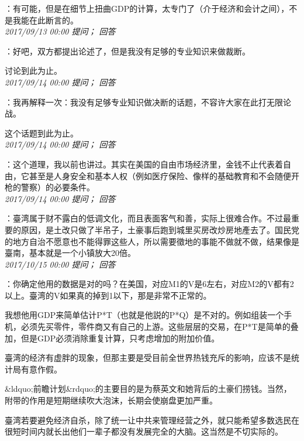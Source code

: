 \documentclass[twocolumn]{ctexart}
\begin{document}
：有可能，但是在细节上扭曲GDP的计算，太专门了（介于经济和会计之间），不是我能在此断言的。\\

\textit{\hfill\noindent\small 2017/09/13 00:00 提问； 回答}

：好吧，双方都提出论述了，但是我没有足够的专业知识来做裁断。

讨论到此为止。\\

\textit{\hfill\noindent\small 2017/09/14 00:00 提问； 回答}

：我再解释一次：我没有足够专业知识做决断的话题，不容许大家在此打无限论战。

这个话题到此为止。\\

\textit{\hfill\noindent\small 2017/09/14 00:00 提问； 回答}

：这个道理，我以前也讲过。其实在美国的自由市场经济里，金钱不止代表着自由，它甚至是人身安全和基本人权（例如医疗保险、像样的基础教育和不会随便开枪的警察）的必要条件。\\

\textit{\hfill\noindent\small 2017/09/14 00:00 提问； 回答}

：臺湾属于财不露白的低调文化，而且表面客气和善，实际上很难合作。不过最重要的原因，是土改只做了半吊子，土豪事后跑到城里买房改炒房地產去了。国民党的地方自治不愿意也不能得罪这些人，所以需要徵地的事能不做就不做，结果像是臺南，基本就是一个小镇放大20倍。\\

\textit{\hfill\noindent\small 2017/10/15 00:00 提问； 回答}

：你确定他用的数据是对的吗？在美国，对应M1的V是6左右，对应M2的V都有2以上。臺湾的V如果真的掉到1以下，那是非常不正常的。

我想他用GDP来简单估计P*T（也就是他説的P*Q）是不对的。例如组装一个手机，必须先买零件，零件商又有自己的上游。这些层层的交易，在P*T是简单的叠加，但是GDP必须消除重复计算，只考虑增加的附加价值。

臺湾的经济有虚胖的现象，但那主要是受目前全世界热钱充斥的影响，应该不是统计局有意作假。

\&ldquo;前瞻计划\&rdquo;的主要目的是为蔡英文和她背后的土豪们捞钱。当然，附带的作用是短期继续吹大泡沫，长期会使崩盘更加严重。

臺湾若要避免经济自杀，除了统一让中共来管理经营之外，就只能希望多数选民在很短时间内就长出他们一辈子都没有发展完全的大脑。这当然是不切实际的。\\
\end{document}
